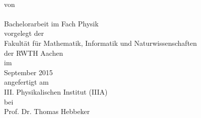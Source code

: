 
\makeatletter
\begin{titlepage}
		\tgherosfont
		\centering
		
		\Large
		
		\vspace*{\fill}
		
		{\Huge \color{ctcolormain}\textbf{\@title}} \\[8mm]
		
		\textsf{von} \\
		{\LARGE \@author} \\[48mm]
		
		Bachelorarbeit im Fach Physik \\[16mm]
		
		\textsf{vorgelegt der} \\
		Fakultät für Mathematik, Informatik und Naturwissenschaften \\der RWTH Aachen \\[8mm]
		
		\textsf{im} \\
		September 2015 \\[8mm]
		
		\textsf{angefertigt am} \\
		III. Physikalischen Institut (IIIA) \\[8mm]
		
		\textsf{bei} \\
		Prof. Dr. Thomas Hebbeker \\
\end{titlepage}
\makeatother